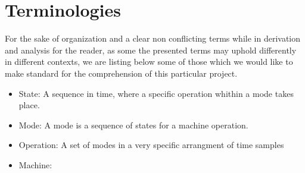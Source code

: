 \documentclass[12pt, letterpaper]{article}
\begin{document}
\pagebreak
\section{Terminologies}

For the sake of organization and a clear non conflicting terms while in derivation and analysis for the reader, as some the presented terms may uphold differently in different contexts, we are listing below some of those which we would like to make standard for the comprehension of this particular project.

\begin{itemize}
  \item State: A sequence in time, where a specific operation whithin a mode takes place.
  \item Mode: A mode is a sequence of states for a machine operation.
  \item Operation: A set of modes in a very specific arrangment of time samples
  \item Machine:
\end{itemize}
\end{document}
